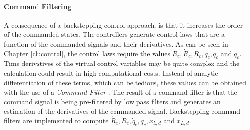 %
%

%


\paragraph{Command Filtering}
A consequence of a backstepping control approach, is that it increases the order of the commanded states. 
The controllers generate control laws that are a function of the commanded signals and their derivatives.
As can be seen in Chapter \ref{ch:control}, the control laws require the values $ R_c, \dot{R}_c, \ddot{R}_c, q_c, \dot{q}_c $ and $ \ddot{q}_c $.
Time derivatives of the virtual control variables may be quite complex and the calculation could result in high computational costs.
Instead of analytic differentiation of these terms, which can be tedious, these values can be obtained with the use of a \textit{Command Filter} \cite{Farrell2008,Farrell2005}. 
The result of a command filter is that the command signal is being pre-filtered by low pass filters and generates an estimation of the derivatives of the commanded signal. Backstepping command filters are implemented to compute $ \dot{R}_c, \ddot{R}_c,\dot{q}_c, \ddot{q}_c,\dot{x}_{L,d}$ and $\ddot{x}_{L,d} $. 
